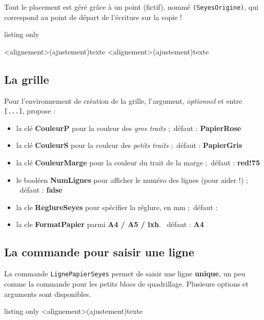 \documentclass[a4paper]{article}
\newcommand\Cle[1]{{\bfseries\sffamily\textlangle #1\textrangle}}
\begin{document}
Tout le placement est géré grâce à un point (fictif), nommé \texttt{(SeyesOrigine)}, qui correspond au point de départ de l'écriture sur la copie !

\begin{PresentationCode}{listing only}
\begin{PleinePageSeyes}[options]
	\LignePapierSeyes[options]<alignement>(ajustement){texte}
	\ParagraphePapierSeyes[options]<alignement>(ajustement){texte}
\end{PleinePageSeyes}
\end{PresentationCode}

\subsection{La grille}

Pour l'environnement de création de la grille, l'argument, \textit{optionnel} et entre \texttt{[...]}, propose :

\begin{itemize}
	\item la clé \Cle{CouleurP} pour la couleur des \textit{gros traits} ;\hfill~défaut : \Cle{PapierRose}
	\item la clé \Cle{CouleurS} pour la couleur des \textit{petits traits} ;\hfill~défaut : \Cle{PapierGris}
	\item la clé \Cle{CouleurMarge} pour la couleur du trait de la marge ;\hfill~défaut : \Cle{red!75}
	\item le booléen \Cle{NumLignes} pour afficher le numéro des lignes (pour aider !) ; \hfill~défaut : \Cle{false}
	\item la cle \Cle{ReglureSeyes} pour spécifier la réglure, en mm ;\hfill~défaut : \Cle{2}
	\item la cle \Cle{FormatPapier} parmi \Cle{A4 / A5 / lxh}. \hfill~défaut : \Cle{A4}
\end{itemize}

\subsection{La commande pour saisir une ligne}

La commande \texttt{LignePapierSeyes} permet de saisir une ligne \textbf{unique}, un peu comme la commande pour les petits blocs de quadrillage. Plusieurs options et arguments sont disponibles.

\begin{PresentationCode}{listing only}
\LignePapierSeyes[options]<alignement>(ajustement){texte}
\end{PresentationCode}
\end{document}
